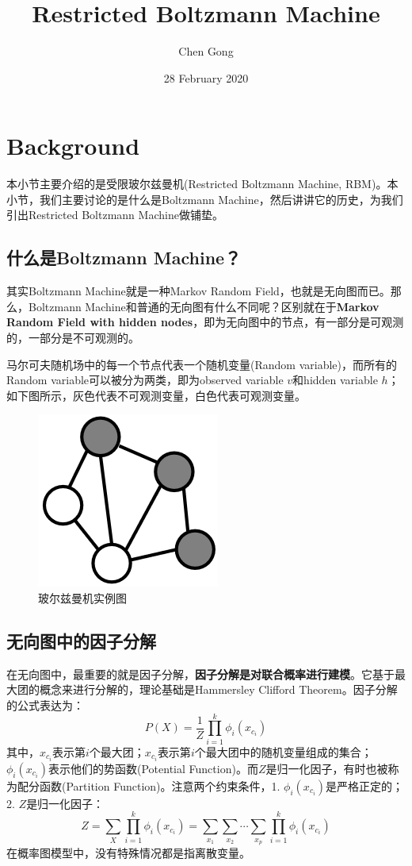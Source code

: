 \documentclass[a4paper]{article}
\title{Restricted Boltzmann Machine}
\author{Chen Gong}
\date{28 February 2020}
\begin{document}
\maketitle
\tableofcontents
\newpage
\setcounter{page}{1} %
\clearpage

\section{Background}
本小节主要介绍的是受限玻尔兹曼机(Restricted Boltzmann Machine, RBM)。本小节，我们主要讨论的是什么是Boltzmann Machine，然后讲讲它的历史，为我们引出Restricted Boltzmann Machine做铺垫。
\subsection{什么是Boltzmann Machine？}
其实Boltzmann Machine就是一种Markov Random Field，也就是无向图而已。那么，Boltzmann Machine和普通的无向图有什么不同呢？区别就在于\textbf{Markov Random Field with hidden nodes}，即为无向图中的节点，有一部分是可观测的，一部分是不可观测的。

马尔可夫随机场中的每一个节点代表一个随机变量(Random variable)，而所有的Random variable可以被分为两类，即为observed variable $v$和hidden variable $h$；如下图所示，灰色代表不可观测变量，白色代表可观测变量。
\begin{figure}[H]
    \centering
    \includegraphics[width=.25\textwidth]{微信图片_20200228220817.png}
    \caption{玻尔兹曼机实例图}
    
\end{figure}

\subsection{无向图中的因子分解}
在无向图中，最重要的就是因子分解，\textbf{因子分解是对联合概率进行建模}。它基于最大团的概念来进行分解的，理论基础是Hammersley Clifford Theorem。因子分解的公式表达为：
\begin{equation}
    P(X) = \frac{1}{Z} \prod_{i=1}^k \phi_i (x_{c_i})
\end{equation}
其中，$x_{c_i}$表示第$i$个最大团；$x_{c_i}$表示第$i$个最大团中的随机变量组成的集合；$\phi_i (x_{c_i})$表示他们的势函数(Potential Function)。而$Z$是归一化因子，有时也被称为配分函数(Partition Function)。注意两个约束条件，1. $\phi_i (x_{c_i})$是严格正定的；2. $Z$是归一化因子：
$$
Z = \sum_X \prod_{i=1}^k \phi_i (x_{c_i}) = \sum_{x_1}\sum_{x_2}\cdots \sum_{x_p} \prod_{i=1}^k \phi_i (x_{c_i})
$$
在概率图模型中，没有特殊情况都是指离散变量。
\end{document}
